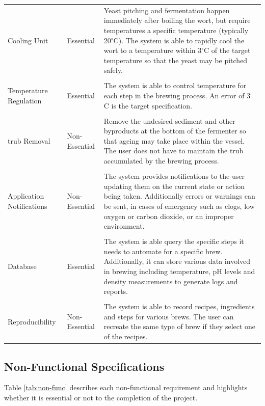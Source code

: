 \documentclass{article}
\begin{document}
\begin{table}[H]
\centering
\begin{tabularx}{\textwidth}{l l Z}
Cooling Unit
& Essential
& Yeast pitching and fermentation happen immediately after boiling the \gls{wort}, but require temperatures a specific temperature (typically 20$^{\circ}$C). The system is able to rapidly cool the \gls{wort} to a temperature within 3$^{\circ}$C of the target temperature so that the yeast may be pitched safely.
\\\\
Temperature Regulation
& Essential
& The system is able to control temperature for each step in the brewing process.  An error of 3$^{\circ}$C is the target specification.
\\\\
\Gls{trub} Removal
& Non-Essential
& Remove the undesired sediment and other byproducts at the bottom of the fermenter so that ageing may take place within the vessel.  The user does not have to maintain the \gls{trub} accumulated by the brewing process.
\\\\
Application Notifications
& Non-Essential
& The system provides notifications to the user updating them on the current state or action being taken.  Additionally errors or warnings can be sent, in cases of emergency such as clogs, low oxygen or carbon dioxide, or an improper environment.
\\\\
Database
& Essential
& The system is able query the specific steps it needs to automate for a specific brew.  Additionally, it can store various data involved in brewing including temperature, pH levels and density measurements to generate logs and reports.
\\\\
Reproducibility
& Non-Essential
& The system is able to record recipes, ingredients and steps for various brews. The user can recreate the same type of brew if they select one of the recipes.
\\
\bottomrule
\end{tabularx}
\label{tab:func}
\end{table}

\pagebreak
\subsection{Non-Functional Specifications}\label{sec:non-functional}
Table \ref{tab:non-func} describes each non-functional requirement and highlights whether it is essential or not to the completion of the project.
\end{document}
